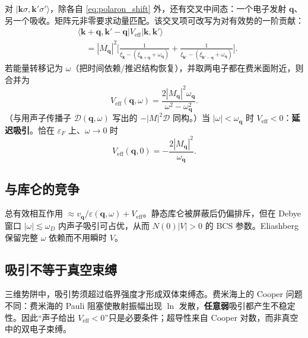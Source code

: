 对 $|\mathbf{k}\sigma,\mathbf{k}'\sigma'\rangle$，除各自 \eqref{eq:polaron_shift} 外，还有交叉中间态：一个电子发射 $\mathbf{q}$、另一个吸收。矩阵元非零要求动量匹配。该交叉项可改写为对有效势的一阶贡献：
\begin{equation}
\begin{aligned}
  &\langle\mathbf{k}+\mathbf{q},\mathbf{k}'-\mathbf{q}|
  V_{\mathrm{eff}}|
  \mathbf{k},\mathbf{k}'\rangle\\
  &\quad=
  |M_{\mathbf{q}}|^2
  \Biggl[
  \frac{1}{\xi_{\mathbf{k}}-(\xi_{\mathbf{k}+\mathbf{q}}+\omega_{\mathbf{q}})}
  +\frac{1}{\xi_{\mathbf{k}'}-(\xi_{\mathbf{k}'-\mathbf{q}}+\omega_{\mathbf{q}})}
  \Biggr].
\end{aligned}
\end{equation}
若能量转移记为 $\omega$（把时间依赖/推迟结构恢复），并取两电子都在费米面附近，则合并为
\begin{equation}
  V_{\mathrm{eff}}(\mathbf{q},\omega)
  =\frac{2|M_{\mathbf{q}}|^2\omega_{\mathbf{q}}}
  {\omega^2-\omega_{\mathbf{q}}^2}.
\label{eq:Veff_ph}
\end{equation}
（与用声子传播子 $\mathcal{D}(\mathbf{q},\omega)$ 写出的 $-|M|^2\mathcal{D}$ 同构。）当 $|\omega|<\omega_{\mathbf{q}}$ 时 $V_{\mathrm{eff}}<0$：\textbf{延迟吸引}。恰在 $\varepsilon_F$ 上、$\omega\to0$ 时
\begin{equation}
  V_{\mathrm{eff}}(\mathbf{q},0)
  =-\frac{2|M_{\mathbf{q}}|^2}{\omega_{\mathbf{q}}}.
\end{equation}

\subsection{与库仑的竞争}

总有效相互作用 $\approx v_{\mathbf{q}}/\varepsilon(\mathbf{q},\omega)+V_{\mathrm{eff}}$。静态库仑被屏蔽后仍偏排斥，但在 Debye 窗口 $|\omega|\lesssim\omega_D$ 内声子吸引可占优，从而 $N(0)|V|>0$ 的 BCS 参数。Eliashberg 保留完整 $\omega$ 依赖而不用瞬时 $V$。

\subsection{吸引不等于真空束缚}

三维势阱中，吸引势须超过临界强度才形成双体束缚态。费米海上的 Cooper 问题不同：费米海的 Pauli 阻塞使散射振幅出现 $\ln$ 发散，\textbf{任意弱}吸引都产生不稳定性。因此“声子给出 $V_{\mathrm{eff}}<0$”只是必要条件；超导性来自 Cooper 对数，而非真空中的双电子束缚。

